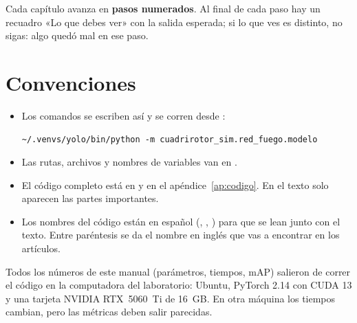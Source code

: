 Cada capítulo avanza en \textbf{pasos numerados}. Al final de cada paso hay un
recuadro «Lo que debes ver» con la salida esperada; si lo que ves es distinto,
no sigas: algo quedó mal en ese paso.

\section*{Convenciones}
\begin{itemize}
  \item Los comandos se escriben así y se corren desde :
\begin{lstlisting}[style=bash]
~/.venvs/yolo/bin/python -m cuadrirotor_sim.red_fuego.modelo
\end{lstlisting}
  \item Las rutas, archivos y nombres de variables van en .
  \item El código completo está en  y en el
        apéndice~\ref{ap:codigo}. En el texto solo aparecen las partes importantes.
  \item Los nombres del código están en español (, ,
        ) para que se lean junto con el texto. Entre paréntesis se
        da el nombre en inglés que vas a encontrar en los artículos.
\end{itemize}

\begin{nota}
Todos los números de este manual (parámetros, tiempos, mAP) salieron de correr el
código en la computadora del laboratorio: Ubuntu, PyTorch 2.14 con CUDA 13 y una
tarjeta NVIDIA RTX~5060~Ti de 16~GB. En otra máquina los tiempos cambian, pero
las métricas deben salir parecidas.
\end{nota}
